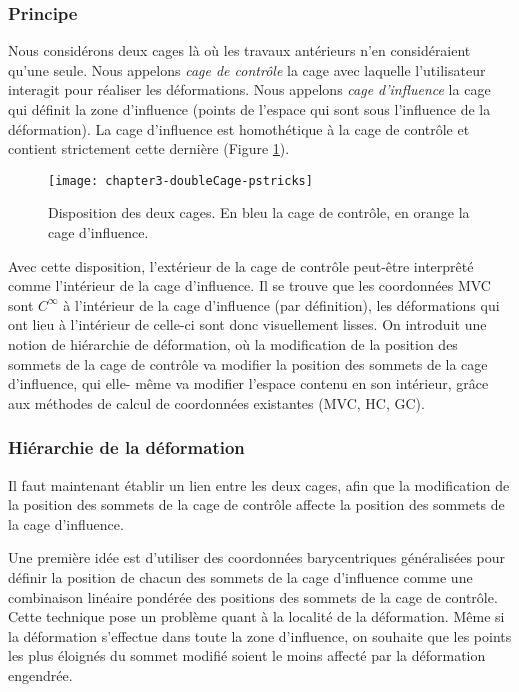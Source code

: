 \subsubsection{Principe}

Nous considérons deux cages là où les travaux antérieurs n'en considéraient
qu'une seule. Nous appelons \textit{cage de contrôle} la cage avec laquelle
l'utilisateur interagit pour réaliser les déformations. Nous appelons
\textit{cage d'influence} la cage qui définit la zone d'influence (points de
l'espace qui sont sous l'influence de la déformation). La cage d'influence est
homothétique à la cage de contrôle et contient strictement cette dernière
(Figure \ref{MELDou}).

\begin{figure}[ht]
  \begin{center}
    \texttt{[image: chapter3-doubleCage-pstricks]}

    \caption[Disposition des cages de contrôle et d'influence] {Disposition
des deux cages. En bleu la cage de contrôle, en orange la cage d'influence.}

    \label{MELDou}
  \end{center}
\end{figure}

Avec cette disposition, l'extérieur de la cage de contrôle peut-être
interprêté comme l'intérieur de la cage d'influence. Il se trouve que les
coordonnées MVC sont $C^{\infty}$ à l'intérieur de la cage d'influence (par
définition), les déformations qui ont lieu à l'intérieur de celle-ci sont donc
visuellement lisses. On introduit une notion de hiérarchie de déformation, où
la modification de la position des sommets de la cage de contrôle va modifier
la position des sommets de la cage d'influence, qui elle- même va modifier
l'espace contenu en son intérieur, grâce aux méthodes de calcul de coordonnées
existantes (MVC, HC, GC). \\

\subsubsection{Hiérarchie de la déformation}

Il faut maintenant établir un lien entre les deux cages, afin que la
modification de la position des sommets de la cage de contrôle affecte la
position des sommets de la cage d'influence.

Une première idée est d'utiliser des coordonnées barycentriques généralisées
pour définir la position de chacun des sommets de la cage d'influence comme
une combinaison linéaire pondérée des positions des sommets de la cage de
contrôle. Cette technique pose un problème quant à la localité de la
déformation. Même si la déformation s'effectue dans toute la zone d'influence,
on souhaite que les points les plus éloignés du sommet modifié soient le moins
affecté par la déformation engendrée.

